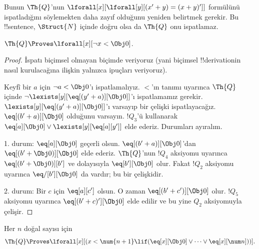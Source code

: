 \documentclass[../../../include/open-logic-section]{subfiles}
\begin{document}
Bunun $\Th{Q}$'nun
$\lforall[x][\lforall[y][(x'+y)=(x+y)']]$ formülünü ispatladığını
söylemekten daha zayıf olduğunu yeniden belirtmek gerekir. Bu !!{sentence},
$\Struct{N}$ içinde doğru olsa da $\Th{Q}$ onu ispatlamaz.

\begin{lem}
$\Th{Q} \Proves \lforall[x][\lnot x < \Obj 0]$.
\end{lem}

\begin{proof}
İspatı biçimsel olmayan biçimde veriyoruz (yani biçimsel !!{derivation}{}in
nasıl kurulacağına ilişkin yalnızca ipuçları veriyoruz).

Keyfî bir $a$ için $\lnot a<\Obj 0$'ı ispatlamalıyız. $<$'ın tanımı
uyarınca $\Th{Q}$ içinde
$\lnot\lexists[y][\eq[(y'+a)][\Obj 0]]$'ı ispatlamamız gerekir.
$\lexists[y][\eq[(y'+a)][\Obj 0]]$'ı varsayıp bir çelişki ispatlayacağız.
$\eq[(b'+a)][\Obj 0]$ olduğunu varsayın. $!Q_3$'ü kullanarak
$\eq[a][\Obj 0]\lor\lexists[y][\eq[a][y']]$ elde ederiz. Durumları ayıralım.

1. durum: $\eq[a][\Obj 0]$ geçerli olsun. $\eq[(b'+a)][\Obj 0]$'dan
$\eq[(b'+\Obj 0)][\Obj 0]$ elde ederiz. $\Th{Q}$'nun $!Q_4$ aksiyomu
uyarınca $\eq[(b'+\Obj 0)][b']$ ve dolayısıyla $\eq[b'][\Obj 0]$ olur.
Fakat $!Q_2$ aksiyomu uyarınca $\eq/[b'][\Obj 0]$ da vardır; bu bir
çelişkidir.

2. durum: Bir $c$ için $\eq[a][c']$ olsun. O zaman
$\eq[(b'+c')][\Obj 0]$ olur. $!Q_5$ aksiyomu uyarınca
$\eq[(b'+c)'][\Obj 0]$ elde edilir ve bu yine $Q_2$ aksiyomuyla çelişir.
\end{proof}

\begin{lem}
Her $n$ doğal sayısı için
  \[
  \Th{Q} \Proves
  \lforall[x][(x < \num {n+1} \lif (\eq[x][\Obj 0] \lor \dots \lor
    \eq[x][\num n]))].
  \]
\end{lem}
\end{document}

